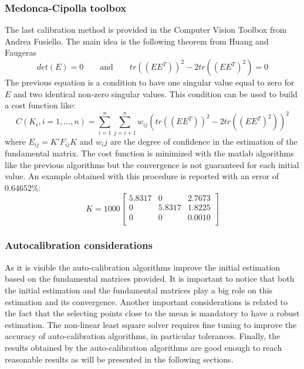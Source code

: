 \documentclass[11pt]{article}
\begin{document}
\subsubsection{Medonca-Cipolla toolbox}
The last calibration method is provided in the Computer Vision Toolbox from Andrea Fusiello. The main idea is the following theorem from Huang and Faugeras \cite{Faugeras89}
\begin{equation}
    det(E) = 0 \qquad \text{and} \qquad tr((EE^T))^2 - 2 tr((EE^T)^2) = 0
\end{equation}
The previous equation is a condition to have one singular value equal to zero for $E$ and two identical non-zero singular values. This condition can be used to build a cost function like:
\begin{equation}
    C(K_i, i = 1,\dots, n) = \sum_{i=1}^{n} \sum_{j=i+1}^{n} w_{ij} (tr((EE^T))^2 - 2 tr((EE^T)^2))^2
\end{equation}
where $E_{ij} = K'F_{ij}K$ and $w_ij$ are the degree of confidence in the estimation of the fundamental matrix. The cost function is minimized with the matlab algorithms like the previous algorithms but the convergence is not guaranteed for each initial value. An example obtained with this procedure is reported with an error of $0.64652\%$:
\begin{equation}
    K = 1000 \begin{bmatrix}
     5.8317  &       0   & 2.7673\\
          0  &  5.8317   & 1.8225\\
          0  &       0   & 0.0010\\ 
\end{bmatrix}
\end{equation}

\bigskip
\subsubsection{Autocalibration considerations}
As it is visible the auto-calibration algorithms improve the initial estimation based on the fundamental matrices provided. It is important to notice that both the initial estimation and the fundamental matrices play a big role on this estimation and its convergence. Another important considerations is related to the fact that the selecting points close to the mean is mandatory to have a robust estimation. The non-linear least square solver requires fine tuning to improve the accuracy of auto-calibration algorithms, in particular tolerances. Finally, the results obtained by the auto-calibration algorithms are good enough to reach reasonable results as will be presented in the following sections.
\end{document}
